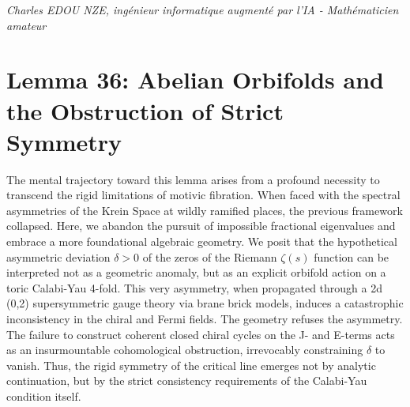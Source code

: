 \documentclass[
]{article}
\begin{document}
\vspace{1cm}
\begin{flushright}
\textit{Charles EDOU NZE, ingénieur informatique augmenté par l'IA - Mathématicien amateur}
\end{flushright}

\section*{Lemma 36: Abelian Orbifolds and the Obstruction of Strict Symmetry}

The mental trajectory toward this lemma arises from a profound necessity to transcend the rigid limitations of motivic fibration. When faced with the spectral asymmetries of the Krein Space at wildly ramified places, the previous framework collapsed. Here, we abandon the pursuit of impossible fractional eigenvalues and embrace a more foundational algebraic geometry. We posit that the hypothetical asymmetric deviation $\delta > 0$ of the zeros of the Riemann $\zeta(s)$ function can be interpreted not as a geometric anomaly, but as an explicit orbifold action on a toric Calabi-Yau 4-fold. This very asymmetry, when propagated through a 2d (0,2) supersymmetric gauge theory via brane brick models, induces a catastrophic inconsistency in the chiral and Fermi fields. The geometry refuses the asymmetry. The failure to construct coherent closed chiral cycles on the J- and E-terms acts as an insurmountable cohomological obstruction, irrevocably constraining $\delta$ to vanish. Thus, the rigid symmetry of the critical line emerges not by analytic continuation, but by the strict consistency requirements of the Calabi-Yau condition itself.
\end{document}
